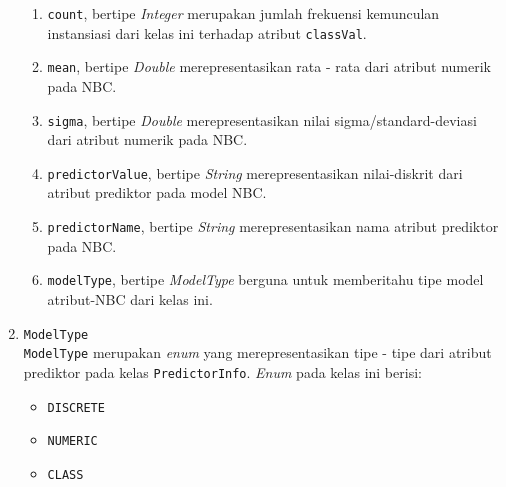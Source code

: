 \begin{enumerate}
\begin{enumerate}
		\item \texttt{count}, bertipe \textit{Integer} merupakan jumlah frekuensi kemunculan instansiasi dari kelas ini terhadap atribut \texttt{classVal}.
		
		\item \texttt{mean}, bertipe \textit{Double} merepresentasikan rata - rata dari atribut numerik pada NBC.
		
		\item \texttt{sigma}, bertipe \textit{Double} merepresentasikan nilai sigma/standard-deviasi dari atribut numerik pada NBC.
		
		\item \texttt{predictorValue}, bertipe \textit{String} merepresentasikan nilai-diskrit dari atribut prediktor pada model NBC.
		
		\item \texttt{predictorName}, bertipe \textit{String} merepresentasikan nama atribut prediktor pada NBC.
		
		\item \texttt{modelType}, bertipe \textit{ModelType} berguna untuk memberitahu tipe model atribut-NBC dari kelas ini.
		
		
	\end{enumerate}

	\item \texttt{ModelType}\\
	\texttt{ModelType} merupakan \textit{enum} yang merepresentasikan tipe - tipe dari atribut prediktor pada kelas \texttt{PredictorInfo}. \textit{Enum} pada kelas ini berisi:
	\begin{itemize}
		\item \texttt{DISCRETE}
		\item \texttt{NUMERIC}
		\item \texttt{CLASS}
	\end{itemize}

\end{enumerate}



